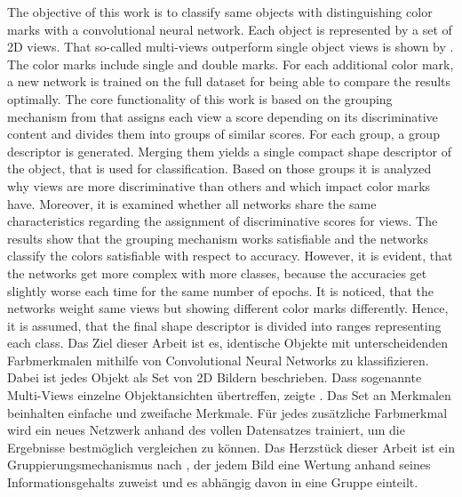 \documentclass[a4paper,            	%
               12pt,               	%
               chapterprefix,      	%
               appendixprefix,		%
               headsepline,        	%
               twoside,				%
               draft=false]         %
               {scrbook}			%
\theoremstyle{defstyle}
\theoremstyle{bspstyle}
\begin{document}
\frontmatter			%
\maketitle				%
\begin{BaMaAbstract}{	%
	The objective of this work is to classify same objects with distinguishing color marks with a convolutional neural network.
	Each object is represented by a set of 2D views.
	That so-called multi-views outperform single object views is shown by \cite{Su:2015:MCN:2919332.2919750}.
	The color marks include single and double marks.
	For each additional color mark, a new network is trained on the full dataset for being able to compare the results optimally.
	The core functionality of this work is based on the grouping mechanism from \cite{Feng2018} that assigns each view a score depending on its discriminative content and divides them into groups of similar scores.
	For each group, a group descriptor is generated.
	Merging them yields a single compact shape descriptor of the object, that is used for classification.
	Based on those groups it is analyzed why views are more discriminative than others and which impact color marks have.
	Moreover, it is examined whether all networks share the same characteristics regarding the assignment of discriminative scores for views.
	The results show that the grouping mechanism works satisfiable and the networks classify the colors satisfiable with respect to accuracy.
	However, it is evident, that the networks get more complex with more classes, because the accuracies get slightly worse each time for the same number of epochs.
	It is noticed, that the networks weight same views but showing different color marks differently.
	Hence, it is assumed, that the final shape descriptor is divided into ranges representing each class.
}{
	Das Ziel dieser Arbeit ist es, identische Objekte mit unterscheidenden Farbmerkmalen mithilfe von Convolutional Neural Networks zu klassifizieren.
	Dabei ist jedes Objekt als Set von 2D Bildern beschrieben.
	Dass sogenannte Multi-Views einzelne Objektansichten übertreffen, zeigte \cite{Su:2015:MCN:2919332.2919750}.
	Das Set an Merkmalen beinhalten einfache und zweifache Merkmale.
	Für jedes zusätzliche Farbmerkmal wird ein neues Netzwerk anhand des vollen Datensatzes trainiert, um die Ergebnisse bestmöglich vergleichen zu können.
	Das Herzstück dieser Arbeit ist ein Gruppierungsmechanismus nach \cite{Feng2018}, der jedem Bild eine Wertung anhand seines Informationsgehalts zuweist und es abhängig davon in eine Gruppe einteilt.
}
\end{BaMaAbstract}
\end{document}
